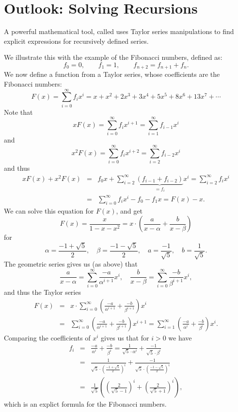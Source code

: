 
\section{Outlook: Solving Recursions}
\label{solvfibo}

A powerful mathematical tool, called  uses
Taylor series manipulations to find explicit expressions for recursively
defined series. 

We illustrate this with the example of the Fibonacci
numbers, defined as:
\[
f_0=0,\qquad f_1=1,\qquad f_{n+2}=f_{n+1}+f_n.
\]
We now define a function from a Taylor series, whose coefficients are the
Fibonacci numbers:
\[
F(x)=\sum_{i=0}^\infty f_i x^i=x+x^2+2x^3+3x^4+5x^5+8x^6+13x^7+\cdots
\]
Note that
\[
xF(x)=\sum_{i=0}^\infty f_i x^{i+1}=\sum_{i=1}^\infty f_{i-1} x^i
\]
and
\[
x^2F(x)=\sum_{i=0}^\infty f_i x^{i+2}=\sum_{i=2}^\infty f_{i-2} x^i
\]
and thus
\begin{eqnarray*}
xF(x)+x^2F(x)&=&f_0x+\sum_{i=2}^\infty \underbrace{(f_{i-1}+f_{i-2})}_{=f_i} x^i
=\sum_{i=2}^\infty f_i x^i\\
&=&\sum_{i=0}^\infty f_i x^i-f_0-f_1x=F(x)-x.
\end{eqnarray*}
We can solve this equation for $F(x)$, and get
\[
F(x)=\frac{x}{1-x-x^2}=x\cdot\left(\frac{a}{x-\alpha}+\frac{b}{x-\beta}\right)
\]
for
\[
\alpha=\frac{-1+\sqrt{5}}{2},\quad\beta=\frac{-1-\sqrt{5}}{2},\quad
a=\frac{-1}{\sqrt{5}},\quad b=\frac{1}{\sqrt{5}}.
\]
The geometric series gives us (as above) that 
\[
\frac{a}{x-\alpha}=\sum_{i=0}^\infty \frac{-a}{\alpha^{i+1}}x^i,\quad
\frac{b}{x-\beta}=\sum_{i=0}^\infty \frac{-b}{\beta^{i+1}}x^i,
\]
and thus the Taylor series
\begin{eqnarray*}
F(x)&=& x\cdot
\sum_{i=0}^\infty\left(\frac{-a}{\alpha^{i+1}}+\frac{-b}{\beta^{i+1}}\right)x^i\\
&=&
\sum_{i=0}^\infty\left(\frac{-a}{\alpha^{i+1}}+\frac{-b}{\beta^{i+1}}\right)x^{i+1}
=\sum_{i=1}^\infty\left(\frac{-a}{\alpha^{i}}+\frac{-b}{\beta^{i}}\right)x^{i}.
\end{eqnarray*}
Comparing the coefficients of $x^i$ gives us that for $i>0$ we have
\begin{eqnarray*}
f_i&=&\frac{-a}{\alpha^{i}}+\frac{-b}{\beta^{i}}
=
\frac{1}{\sqrt{5}\cdot \alpha^i}+\frac{-1}{\sqrt{5}\cdot \beta^i}\\
&=&
\frac{1}{\sqrt{5}\cdot \left(\frac{-1+\sqrt{5}}{2}\right)^i}
+\frac{-1}{\sqrt{5}\cdot \left(\frac{-1-\sqrt{5}}{2}\right)^i}\\
&=&\frac{1}{\sqrt{5}}\left(\left(\frac{2}{\sqrt{5}-1}\right)^i+\left(\frac{2}{\sqrt{5}+1}\right)^i\right),
\end{eqnarray*}
which is an explict formula for the Fibonacci numbers.
